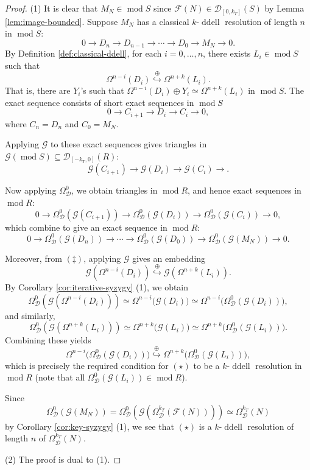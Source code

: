 \documentclass[10pt,a4paper]{amsart}
\newcommand{\D}{\mathcal{D}}
\DeclareMathOperator{\ddell}{ddell}
\DeclareMathOperator{\modd}{mod}
\newcommand{\oemb}{\stackrel{\oplus}{\hookrightarrow}}
\newcommand{\syz}{\Omega_{\mathcal{D}}}
\begin{document}
\begin{proof} (1)
It is clear that $M_N\in\modd S$ since $\mathcal{F}(N)\in\D_{[0,k_T]}(S)$ by Lemma \ref{lem:image-bounded}.
Suppose $M_N$ has a classical $k$-$\ddell$ resolution of length \(n\) in $\modd S$:
\[
0 \longrightarrow D_n \longrightarrow D_{n-1} \longrightarrow \cdots \longrightarrow D_0 \longrightarrow M_N \longrightarrow 0. \tag{$\dagger$}
\]
By Definition \ref{def:classical-ddell}, for each \(i=0,\ldots,n\), there exists \(L_i\in\modd S\) such that
\[
\Omega^{n-i}(D_i) \oemb \Omega^{n+k}(L_i). \tag{$\ddagger$}
\]
That is, there are $Y_i$'s such that $\Omega^{n-i}(D_i)\oplus Y_i\simeq \Omega^{n+k}(L_i)$ in $\modd S$. The exact sequence consists of short exact sequences in $\modd S$ 
\[
    0\to C_{i+1}\to D_i\to C_i\to 0, 
\]
where $C_n=D_n$ and $C_0=M_N$.

Applying $\mathcal{G}$ to these exact sequences gives triangles in $\mathcal{G}(\modd S)\subseteq \D_{[-k_T,0]}(R)$:
 \[
    \mathcal{G}(C_{i+1})\to \mathcal{G}(D_i)\to \mathcal{G}(C_i)\to . 
\]
 
Now applying $\syz^{0}$, we obtain triangles in $\modd R$, and hence exact sequences in $\modd R$:
 \[
    0\to \syz^{0}(\mathcal{G}(C_{i+1}))\to \syz^{0}(\mathcal{G}(D_i))\to \syz^{0}(\mathcal{G}(C_i))\to 0,
\]
which combine to give an exact sequence in $\modd R$:
\[
0 \longrightarrow \syz^{0}(\mathcal{G}(D_n)) \longrightarrow \cdots \longrightarrow \syz^{0}(\mathcal{G}(D_0)) \longrightarrow \syz^{0}(\mathcal{G}(M_N)) \longrightarrow 0. \tag{$\star$}
\]

 Moreover, from \((\ddagger)\), applying $\mathcal{G}$ gives an embedding
\[
\mathcal{G}(\Omega^{n-i}(D_i)) \oemb \mathcal{G}(\Omega^{n+k}(L_i)).
\]
By Corollary \ref{cor:iterative-syzygy} (1), we obtain
\[
\syz^{0}(\mathcal{G}(\Omega^{n-i}(D_i))) \simeq \Omega^{n-i}\bigl(\mathcal{G}(D_i)\bigr) \simeq \Omega^{n-i}\bigl(\syz^{0}(\mathcal{G}(D_i))\bigr),
\]
and similarly,
\[
\syz^{0}(\mathcal{G}(\Omega^{n+k}(L_i))) \simeq \Omega^{n+k}\bigl(\mathcal{G}(L_i)\bigr) \simeq \Omega^{n+k}\bigl(\syz^{0}(\mathcal{G}(L_i))\bigr).
\]
Combining these yields
\[
\Omega^{n-i}\bigl(\syz^{0}(\mathcal{G}(D_i))\bigr) \oemb \Omega^{n+k}\bigl(\syz^{0}(\mathcal{G}(L_i))\bigr),
\]
which is precisely the required condition for \((\star)\) to be a $k$-$\ddell$ resolution in $\modd R$ (note that all $\syz^{0}(\mathcal{G}(L_i))\in \modd R$).

Since
\[
\syz^{0}(\mathcal{G}(M_N))
= \syz^{0}(\mathcal{G}(\syz^{k_T}(\mathcal{F}(N))))
\simeq \syz^{k_T}(N)
\] 
by Corollary \ref{cor:key-syzygy} (1), we see that \((\star)\) is a $k$-$\ddell$ resolution of length $n$ of $\syz^{k_T}(N)$.

(2) The proof is dual to (1).
\end{proof}
\end{document}
